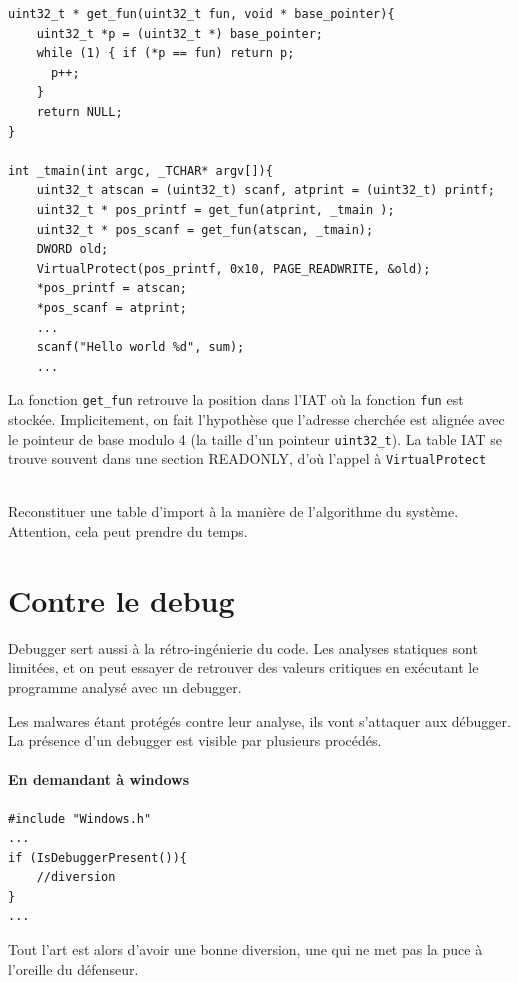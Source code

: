 \documentclass{book}
\newenvironment{commentaire}[1]{%
	\def\FrameCommand{\fboxrule=\FrameRule\fboxsep=\FrameSep \fcolorbox{yellow!50}{yellow!10}}%
	\MakeFramed {\advance\hsize-\width \FrameRestore}
	\noindent {\bf #1}\\
}%
{\endMakeFramed}
\newcommand{\code}[1]{\texttt{#1}}
\newcommand{\Windows}{{\sc windows}}
\begin{document}
\begin{verbatim}
uint32_t * get_fun(uint32_t fun, void * base_pointer){
	uint32_t *p = (uint32_t *) base_pointer;
	while (1) { if (*p == fun) return p;
	  p++;
	}
	return NULL;
}

int _tmain(int argc, _TCHAR* argv[]){
	uint32_t atscan = (uint32_t) scanf, atprint = (uint32_t) printf;
	uint32_t * pos_printf = get_fun(atprint, _tmain );
	uint32_t * pos_scanf = get_fun(atscan, _tmain);
	DWORD old;
	VirtualProtect(pos_printf, 0x10, PAGE_READWRITE, &old);
	*pos_printf = atscan;
	*pos_scanf = atprint;
	...
	scanf("Hello world %d", sum);
	...
\end{verbatim}

La fonction \code{get\_fun} retrouve la position dans l'IAT où la fonction \code{fun} est stockée. Implicitement, on fait l'hypothèse que l'adresse cherchée est alignée avec le pointeur de base modulo 4 (la taille d'un pointeur \code{uint32\_t}). La table IAT se trouve souvent dans une section READONLY, d'où l'appel à \code{VirtualProtect}


\begin{commentaire}{Pour aller plus loin}
	Reconstituer une table d'import à la manière de l'algorithme du système. Attention, cela peut prendre du temps. 
\end{commentaire}

\section{Contre le debug}

Debugger sert aussi à la rétro-ingénierie du code. Les analyses statiques sont limitées, et on peut essayer de retrouver des valeurs critiques en exécutant le programme analysé avec un debugger. 

 Les malwares étant protégés contre leur analyse, ils vont s'attaquer aux débugger. La présence d'un debugger est visible par plusieurs procédés. 

\paragraph{En demandant à \Windows}

\begin{verbatim}
#include "Windows.h"
...
if (IsDebuggerPresent()){
	//diversion
}
...
\end{verbatim}

Tout l'art est alors d'avoir une bonne diversion, une qui ne met pas la puce à l'oreille du défenseur. 
\end{document}
